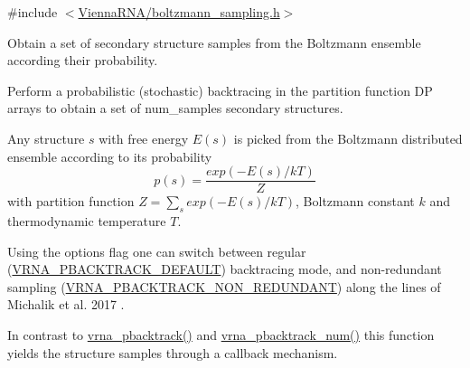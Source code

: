 {\ttfamily \#include $<$\mbox{\hyperlink{boltzmann__sampling_8h}{Vienna\+R\+N\+A/boltzmann\+\_\+sampling.\+h}}$>$}



Obtain a set of secondary structure samples from the Boltzmann ensemble according their probability. 

Perform a probabilistic (stochastic) backtracing in the partition function DP arrays to obtain a set of {\ttfamily num\+\_\+samples} secondary structures.

Any structure $ s $ with free energy $ E(s) $ is picked from the Boltzmann distributed ensemble according to its probability \[ p(s) = \frac{exp(-E(s) / kT)}{Z} \] with partition function $ Z = \sum_s exp(-E(s) / kT) $, Boltzmann constant $ k $ and thermodynamic temperature $ T $.

Using the {\ttfamily options} flag one can switch between regular (\mbox{\hyperlink{group__subopt__stochbt_ga760aa2fb2d5e3d7521a11454a21e9b9f}{V\+R\+N\+A\+\_\+\+P\+B\+A\+C\+K\+T\+R\+A\+C\+K\+\_\+\+D\+E\+F\+A\+U\+LT}}) backtracing mode, and non-\/redundant sampling (\mbox{\hyperlink{group__subopt__stochbt_ga9d580ce645aa0c38b69afdf56c332200}{V\+R\+N\+A\+\_\+\+P\+B\+A\+C\+K\+T\+R\+A\+C\+K\+\_\+\+N\+O\+N\+\_\+\+R\+E\+D\+U\+N\+D\+A\+NT}}) along the lines of Michalik et al. 2017 \cite{michalik:2017}.

In contrast to \mbox{\hyperlink{group__subopt__stochbt_ga594844ac73c4e66e00d6791b31540634}{vrna\+\_\+pbacktrack()}} and \mbox{\hyperlink{group__subopt__stochbt_ga596ed9bcd86f629a7c7c59c58b297db5}{vrna\+\_\+pbacktrack\+\_\+num()}} this function yields the structure samples through a callback mechanism.

